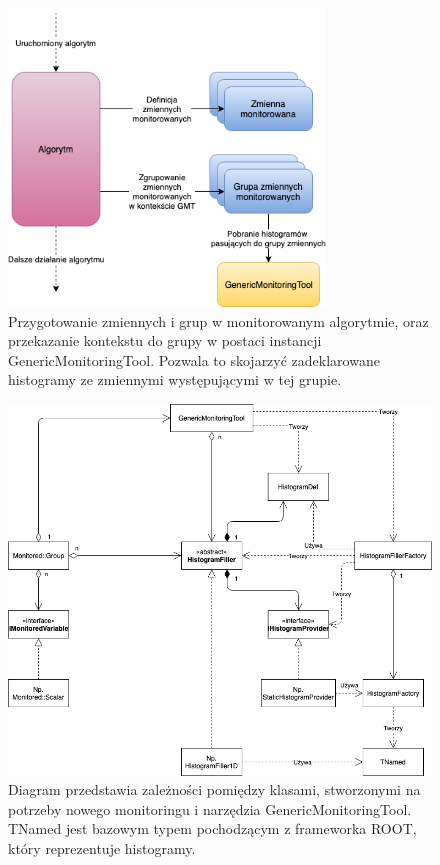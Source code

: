 \begin{figure}[!ht]
\centering
\includegraphics[width=0.75\textwidth]{img/algo_run.png}
\caption{
Przygotowanie zmiennych i grup w monitorowanym algorytmie, oraz przekazanie kontekstu do grupy w postaci instancji GenericMonitoringTool. Pozwala to skojarzyć zadeklarowane histogramy ze zmiennymi występującymi w tej grupie. 
}
\label{fig:athena:algoRun}
\end{figure}

\begin{figure}[!ht]
\centering
\includegraphics[width=1\textwidth]{img/classes_relations.png}
\caption{
Diagram przedstawia zależności pomiędzy klasami, stworzonymi na potrzeby nowego monitoringu i narzędzia GenericMonitoringTool. TNamed jest bazowym typem pochodzącym z frameworka ROOT, który reprezentuje histogramy.
}
\label{fig:athena:classesRelations}
\end{figure}

